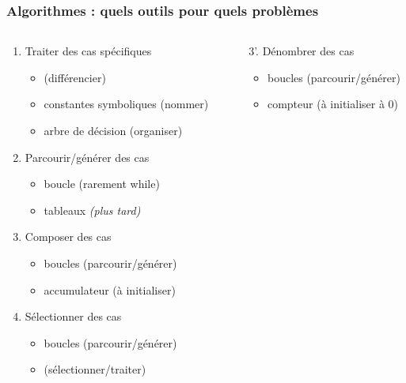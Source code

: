 \documentclass[xcolor=pdftex,svgnames,table]{beamer}
\begin{document}
\begin{frame}
  \frametitle{Algorithmes : quels outils pour quels problèmes}
\pause
\begin{columns}
 \begin{column}[t]{0.59\linewidth}
  \begin{enumerate}
    \item  Traiter des cas spécifiques 
      \begin{itemize}
      \item \alert{} (différencier)
      \item \alert{} constantes symboliques (nommer)
      \item arbre de décision (organiser)
     \end{itemize}\pause
    \item Parcourir/générer des cas\pause
      \begin{itemize}
      \item \alert{boucle } (rarement while)
      \item tableaux \emph{(plus tard)}
      \end{itemize}\pause
   \item Composer des cas
      \begin{itemize}
        \item boucles (parcourir/générer)
        \pause
      \item \alert{accumulateur} (à initialiser)
      \end{itemize}\pause
   \item Sélectionner des cas
      \begin{itemize}
        \item boucles (parcourir/générer)
        \item \alert{}  (sélectionner/traiter)
      \end{itemize}
\setcounter{savedenumi}{\value{enumi}}
\end{enumerate}
\end{column}\hspace{-1cm}
\pause
\begin{column}[t]{0.59\linewidth}
\begin{enumerate}
    \item[3'.] Dénombrer des cas
      \begin{itemize}
        \item boucles (parcourir/générer)
          \pause
        \item \alert{compteur} (à initialiser à 0)
      \end{itemize}\pause

\end{enumerate}
\end{column}
\end{columns}
\end{frame}
\end{document}
